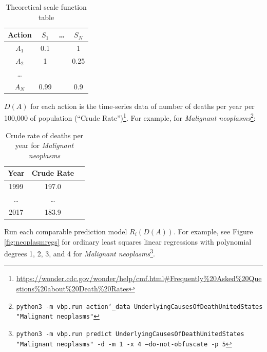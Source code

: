 \documentclass[12pt, a4paper, twocolumn]{article}
\begin{document}
\begin{table}[H]
\centering
\begin{tabular}{cccc}
\toprule
Action & $S_1$  & \ldots & $S_N$  \\
\midrule
$A_1$  & 0.1    &        & 1      \\
$A_2$  & 1      &        & 0.25   \\
\ldots &        &        &        \\
$A_N$  & 0.99   &        & 0.9    \\
\bottomrule
\end{tabular}
\caption{Theoretical scale function table}
\label{table:scaletable}
\end{table}

$D(A)$ for each action is the time-series data of number of deaths per year per 100,000 of population (\enquote{Crude Rate})\footnote{\url{https://wonder.cdc.gov/wonder/help/cmf.html\#Frequently\%20Asked\%20Questions\%20about\%20Death\%20Rates}}. For example, for \textit{Malignant neoplasms}\footnote{\texttt{python3 -m vbp.run action\char`_data UnderlyingCausesOfDeathUnitedStates "Malignant neoplasms"}}:

\begin{table}[H]
\centering
\begin{tabular}{ccc}
\toprule
Year    & Crude Rate \\
\midrule
1999    &      197.0 \\
\ldots  & \ldots     \\
2017    &      183.9 \\
\bottomrule
\end{tabular}
\caption{Crude rate of deaths per year for \textit{Malignant neoplasms}}
\label{table:daa1}
\end{table}

Run each comparable prediction model $R_i(D(A))$. For example, see Figure \ref{fig:neoplasmregs} for ordinary least squares linear regressions with polynomial degrees 1, 2, 3, and 4 for \textit{Malignant neoplasms}\footnote{\texttt{python3 -m vbp.run predict UnderlyingCausesOfDeathUnitedStates "Malignant neoplasms" -d -m 1 -x 4 --do-not-obfuscate -p 5}}.
\end{document}
